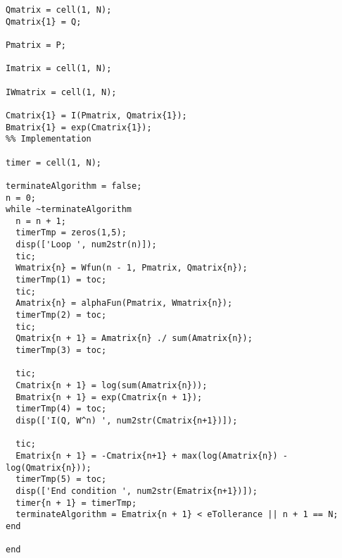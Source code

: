 \begin{lstlisting}
Qmatrix = cell(1, N);
Qmatrix{1} = Q;

Pmatrix = P;

Imatrix = cell(1, N);

IWmatrix = cell(1, N);

Cmatrix{1} = I(Pmatrix, Qmatrix{1});
Bmatrix{1} = exp(Cmatrix{1});
%% Implementation

timer = cell(1, N);

terminateAlgorithm = false;
n = 0;
while ~terminateAlgorithm 
  n = n + 1;
  timerTmp = zeros(1,5);
  disp(['Loop ', num2str(n)]);
  tic;
  Wmatrix{n} = Wfun(n - 1, Pmatrix, Qmatrix{n}); 
  timerTmp(1) = toc;
  tic;
  Amatrix{n} = alphaFun(Pmatrix, Wmatrix{n});
  timerTmp(2) = toc;
  tic;
  Qmatrix{n + 1} = Amatrix{n} ./ sum(Amatrix{n});
  timerTmp(3) = toc;

  tic;
  Cmatrix{n + 1} = log(sum(Amatrix{n}));
  Bmatrix{n + 1} = exp(Cmatrix{n + 1});
  timerTmp(4) = toc;
  disp(['I(Q, W^n) ', num2str(Cmatrix{n+1})]);
  
  tic;
  Ematrix{n + 1} = -Cmatrix{n+1} + max(log(Amatrix{n}) - log(Qmatrix{n}));
  timerTmp(5) = toc;
  disp(['End condition ', num2str(Ematrix{n+1})]);
  timer{n + 1} = timerTmp;
  terminateAlgorithm = Ematrix{n + 1} < eTollerance || n + 1 == N;
end

end
\end{lstlisting}
